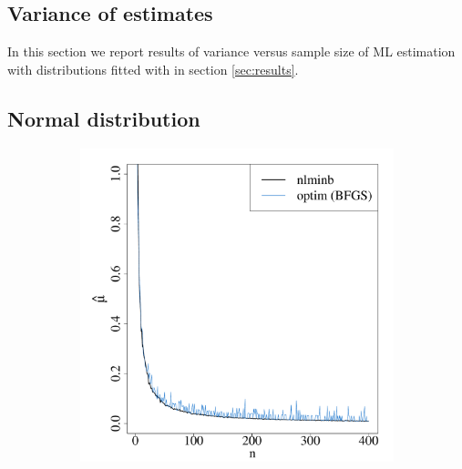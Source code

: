 \documentclass[nojss]{jss}
\begin{document}
\begin{appendix}

\section{Variance of estimates} \label{append:variance}

In this section we report results of variance versus sample size of ML estimation with distributions fitted with  in section \ref{sec:results}.

\subsection{Normal distribution}



\begin{figure}[ht]
    \vspace{-20pt}
    \begin{subfigure}[h]{0.49\textwidth}
        \includegraphics[width=\textwidth]{article-varnorm_a}
        \caption{\label{fig:norma}}
    \end{subfigure}
    \begin{subfigure}[h]{0.49\textwidth}

\end{subfigure}
\end{figure}
\end{appendix}
\end{document}

